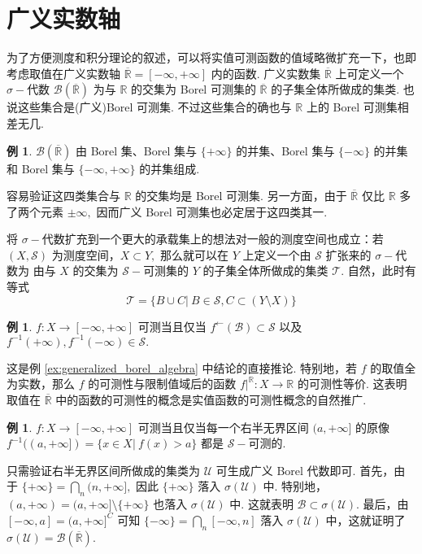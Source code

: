 \documentclass[12pt, a4paper, oneside]{book}
\numberwithin{figure}{section}
\theoremstyle{definition}
\newtheorem{example}[theorem]{例}
\begin{document}
\section{广义实数轴}
为了方便测度和积分理论的叙述，可以将实值可测函数的值域略微扩充一下，也即考虑取值在广义实数轴 $\overline{\mathbb R}=[-\infty,+\infty]$ 内的函数. 广义实数集 $\overline{\mathbb R}$ 上可定义一个 $\sigma-$代数 $\mathcal B(\overline{\mathbb R})$ 为与 $\mathbb R$ 的交集为 Borel 可测集的 $\overline{\mathbb R}$ 的子集全体所做成的集类.
也说这些集合是(广义)Borel 可测集. 不过这些集合的确也与 $\mathbb R$ 上的 Borel 可测集相差无几. 
\begin{example}\label{ex:generalized_borel_algebra}
    $\mathcal B(\overline{\mathbb R})$ 由 Borel 集、Borel 集与 $\{+\infty\}$ 的并集、Borel 集与 $\{-\infty\}$ 的并集和 Borel 集与 $\{-\infty,+\infty\}$ 的并集组成.
\end{example}
容易验证这四类集合与 $\mathbb R$ 的交集均是 Borel 可测集.  另一方面，由于 $\overline{\mathbb R}$ 仅比 $\mathbb R$ 多了两个元素 $\pm\infty,$ 因而广义 Borel 可测集也必定居于这四类其一.

将 $\sigma-$代数扩充到一个更大的承载集上的想法对一般的测度空间也成立：若 $(X,\mathcal S)$ 为测度空间，$X\subset Y,$ 那么就可以在 $Y$ 上定义一个由 $\mathcal S$ 扩张来的 $\sigma-$代数为 
由与 $X$ 的交集为 $\mathcal S-$可测集的 $Y$ 的子集全体所做成的集类 $\mathcal T.$ 自然，此时有等式
\begin{equation}
    \mathcal T=\{B\cup C|\ B\in\mathcal S, C\subset (Y\setminus X)\}
\end{equation}

\begin{example}
    $f:X\to [-\infty,+\infty]$ 可测当且仅当 $f^\leftarrow(\mathcal B)\subset\mathcal S$ 以及 $f^{-1}(+\infty),f^{-1}(-\infty)\in\mathcal S.$ 
\end{example}
这是例 \eqref{ex:generalized_borel_algebra} 中结论的直接推论. 特别地，若 $f$ 的取值全为实数，那么 $f$ 的可测性与限制值域后的函数 $f|^{\mathbb R}:X\to\mathbb R$ 的可测性等价.  
这表明取值在 $\overline{\mathbb R}$ 中的函数的可测性的概念是实值函数的可测性概念的自然推广.

\begin{example}
    $f:X\to [-\infty,+\infty]$ 可测当且仅当每一个右半无界区间 $(a,+\infty]$ 的原像 $f^{-1}((a,+\infty])=\{x\in X|\ f(x)>a\}$ 都是 $\mathcal S-$可测的.
\end{example}
只需验证右半无界区间所做成的集类为 $\mathcal U$ 可生成广义 Borel 代数即可.
首先，由于 $\{+\infty\}=\bigcap_n (n,+\infty],$ 因此 $\{+\infty\}$ 落入 $\sigma(\mathcal U)$ 中. 特别地，$(a,+\infty)=(a,+\infty]\setminus\{+\infty\}$ 也落入 $\sigma(\mathcal U)$ 中. 
这就表明 $\mathcal B\subset \sigma(\mathcal U).$ 最后，由 $[-\infty,a]=(a,+\infty]^C$ 可知 $\{-\infty\}=\bigcap_n [-\infty,n]$ 落入 $\sigma(\mathcal U)$ 中，这就证明了 $\sigma(\mathcal U)=\mathcal B(\overline{\mathbb R}).$
\end{document}

